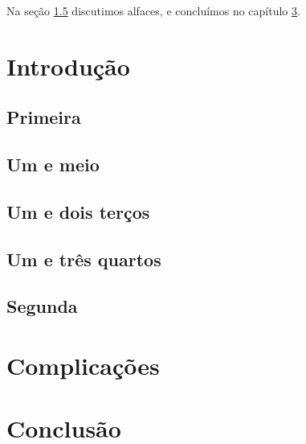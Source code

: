 


\usepackage{hyperref}




\tableofcontents

Na seção \ref{sec:segunda} discutimos alfaces, e concluímos no capítulo \ref{cap:conclusao}.

\chapter{Introdução}
\label{intro}

\section{Primeira}
\section{Um e meio}
\section{Um e dois terços}
\section{Um e três quartos}

\clearpage
\section{Segunda}
\label{sec:segunda}

\clearpage
\chapter{Complicações}

\chapter{Conclusão}
\label{cap:conclusao}
